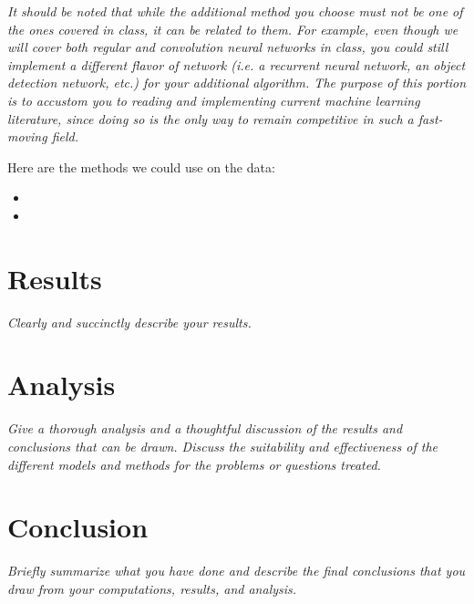 \documentclass[10pt,letterpaper]{article}
\begin{document}
\textit{It should be noted that while the additional method you choose must not be one of the ones covered in class, it can be related to them. For example, even though we will cover both regular and convolution neural networks in class, you could still implement a different flavor of network (i.e. a recurrent neural network, an object detection network, etc.) for your additional algorithm. The purpose of this portion is to accustom you to reading and implementing current machine learning literature, since doing so is the only way to remain competitive in such a fast-moving field.}

Here are the methods we could use on the data:
\begin{itemize}
   \item
   \item
\end{itemize}


\section{Results}
\textit{Clearly and succinctly describe your results.}

\section{Analysis}
\textit{Give a thorough analysis and a thoughtful discussion of the results and conclusions that can be drawn. Discuss the suitability and effectiveness of the different models and methods for the problems or questions treated.}

\section{Conclusion}
\textit{Briefly summarize what you have done and describe the final conclusions that you draw from your computations, results, and analysis.}
\end{document}
